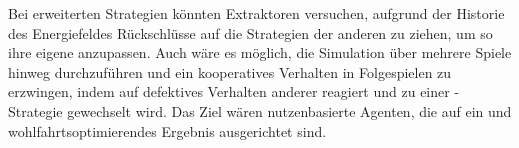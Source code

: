 
Bei erweiterten Strategien könnten Extraktoren versuchen, aufgrund der Historie des Energiefeldes Rückschlüsse auf die Strategien der anderen zu ziehen, um so ihre eigene anzupassen. Auch wäre es möglich, die Simulation über mehrere Spiele hinweg durchzuführen und ein kooperatives Verhalten in Folgespielen zu erzwingen, indem auf defektives Verhalten anderer reagiert und zu einer -Strategie gewechselt wird. Das Ziel wären nutzenbasierte Agenten, die auf ein  und wohlfahrtsoptimierendes Ergebnis ausgerichtet sind.